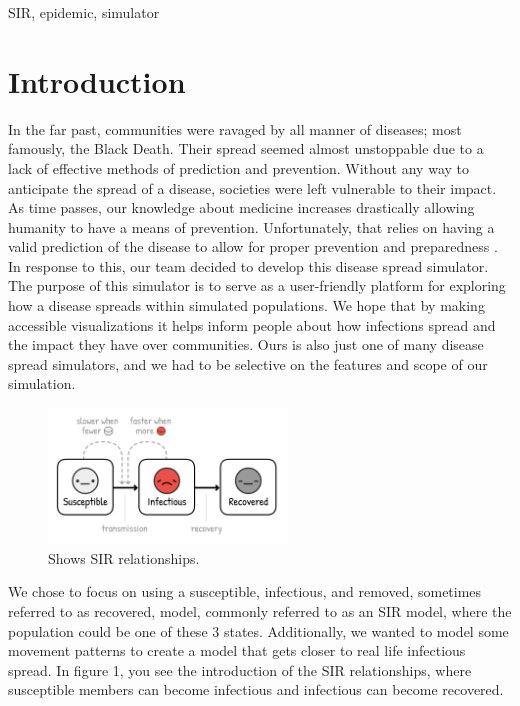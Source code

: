 \documentclass[conference]{IEEEtran}
\begin{document}
\begin{IEEEkeywords}
SIR, epidemic, simulator
\end{IEEEkeywords}

\section{Introduction}
In the far past, communities were ravaged by all manner of diseases; most famously, the Black Death. Their spread seemed almost unstoppable due to a lack of effective methods of prediction and prevention. Without any way to anticipate the spread of a disease, societies were left vulnerable to their impact. As time passes, our knowledge about medicine increases drastically allowing humanity to have a means of prevention. Unfortunately, that relies on having a valid prediction of the disease to allow for proper prevention and preparedness \cite{b7}. In response to this, our team decided to develop this disease spread simulator. The purpose of this simulator is to serve as a user-friendly platform for exploring how a disease spreads within simulated populations. We hope that by making accessible visualizations it helps inform people about how infections spread and the impact they have over communities. Ours is also just one of many disease spread simulators, and we had to be selective on the features and scope of our simulation. 

\begin{figure}[!t]
\centering
\includegraphics[width=2.5in]{Figures/ncase SIR relations.png}
\caption{Shows SIR relationships. \cite{b3}}
\label{fig_sim}
\end{figure}

We chose to focus on using a susceptible, infectious, and removed, sometimes referred to as recovered, model, commonly referred to as an SIR model, where the population could be one of these 3 states. Additionally, we wanted to model some movement patterns to create a model that gets closer to real life infectious spread. In figure 1, you see the introduction of the SIR relationships, where susceptible members can become infectious and infectious can become recovered.
\end{document}
